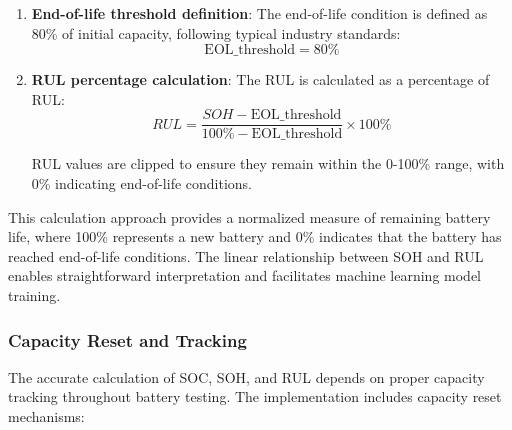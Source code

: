 \begin{enumerate}
    \item \textbf{End-of-life threshold definition}: The end-of-life condition is defined as 80\% of initial capacity, following typical industry standards:
    \begin{equation}
        \text{EOL\_threshold} = 80\%
    \end{equation}
    
    \item \textbf{RUL percentage calculation}: The RUL is calculated as a percentage of RUL:
    \begin{equation}
        RUL = \frac{SOH - \text{EOL\_threshold}}{100\% - \text{EOL\_threshold}} \times 100\%
    \end{equation}
    
    RUL values are clipped to ensure they remain within the 0-100\% range, with 0\% indicating end-of-life conditions.
\end{enumerate}

This calculation approach provides a normalized measure of remaining battery life, where 100\% represents a new battery and 0\% indicates that the battery has reached end-of-life conditions. The linear relationship between SOH and RUL enables straightforward interpretation and facilitates machine learning model training.

\subsubsection{Capacity Reset and Tracking}
\label{subsubsec:capacity_tracking}

The accurate calculation of SOC, SOH, and RUL depends on proper capacity tracking throughout battery testing. The implementation includes capacity reset mechanisms:

